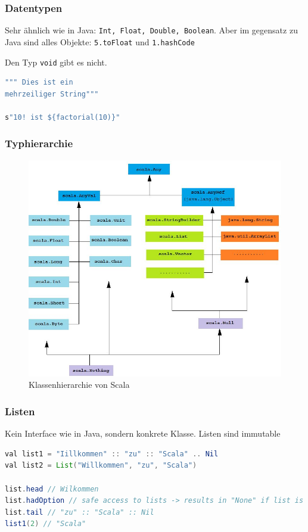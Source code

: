 \subsubsection{Datentypen}
Sehr ähnlich wie in Java: \lstinline|Int, Float, Double, Boolean|. Aber im gegensatz zu Java sind alles Objekte: \lstinline|5.toFloat| und \lstinline|1.hashCode|

Den Typ \lstinline|void| gibt  es nicht.

\begin{lstlisting}[language=java]
""" Dies ist ein
mehrzeiliger String"""

s"10! ist ${factorial(10)}"
\end{lstlisting}

\subsubsection{Typhierarchie}

\begin{figure}[h!]
\centering
\includegraphics[width=0.7\linewidth]{images/scala_klassenhierachy}
\caption{Klassenhierarchie von Scala}
\label{fig:scalaklassenhierachy}
\end{figure}



\subsubsection{Listen}

Kein Interface wie in Java, sondern konkrete Klasse. Listen sind immutable

\begin{lstlisting}[language=java]
val list1 = "Iillkommen" :: "zu" :: "Scala" .. Nil
val list2 = List("Willkommen", "zu", "Scala")

list.head // Wilkommen
list.hadOption // safe access to lists -> results in "None" if list is empty
list.tail // "zu" :: "Scala" :: Nil
list1(2) // "Scala"
\end{lstlisting}

